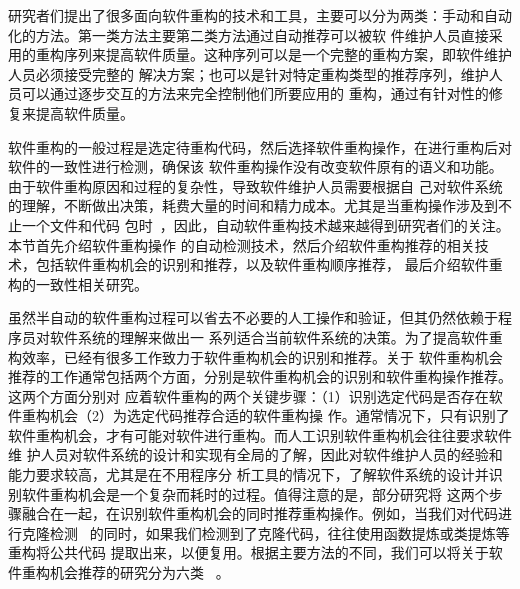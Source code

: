 研究者们提出了很多面向软件重构的技术和工具，主要可以分为两类：手动和自动化的方法。第一类方法主要第二类方法通过自动推荐可以被软
件维护人员直接采用的重构序列来提高软件质量\cite{harman2007pareto, kessentini2011design,
ouni2013maintainability, Silva2014}。这种序列可以是一个完整的重构方案，即软件维护人员必须接受完整的
解决方案；也可以是针对特定重构类型的推荐序列，维护人员可以通过逐步交互的方法来完全控制他们所要应用的
重构，通过有针对性的修复来提高软件质量。

软件重构的一般过程是选定待重构代码，然后选择软件重构操作，在进行重构后对软件的一致性进行检测，确保该
软件重构操作没有改变软件原有的语义和功能。由于软件重构原因和过程的复杂性，导致软件维护人员需要根据自
己对软件系统的理解，不断做出决策，耗费大量的时间和精力成本。尤其是当重构操作涉及到不止一个文件和代码
包时~\cite{liu2013monitor}，因此，自动软件重构技术越来越得到研究者们的关注。本节首先介绍软件重构操作
的自动检测技术，然后介绍软件重构推荐的相关技术，包括软件重构机会的识别和推荐，以及软件重构顺序推荐，
最后介绍软件重构的一致性相关研究。


虽然半自动的软件重构过程可以省去不必要的人工操作和验证，但其仍然依赖于程序员对软件系统的理解来做出一
系列适合当前软件系统的决策。为了提高软件重构效率，已经有很多工作致力于软件重构机会的识别和推荐。关于
软件重构机会推荐的工作通常包括两个方面，分别是软件重构机会的识别和软件重构操作推荐。这两个方面分别对
应着软件重构的两个关键步骤：（1）识别选定代码是否存在软件重构机会（2）为选定代码推荐合适的软件重构操
作。通常情况下，只有识别了软件重构机会，才有可能对软件进行重构。而人工识别软件重构机会往往要求软件维
护人员对软件系统的设计和实现有全局的了解，因此对软件维护人员的经验和能力要求较高，尤其是在不用程序分
析工具的情况下，了解软件系统的设计并识别软件重构机会是一个复杂而耗时的过程。值得注意的是，部分研究将
这两个步骤融合在一起，在识别软件重构机会的同时推荐重构操作。例如，当我们对代码进行克隆检测
~\cite{kamiya2002ccfinder}的同时，如果我们检测到了克隆代码，往往使用函数提炼或类提炼等重构将公共代码
提取出来，以便复用。根据主要方法的不同，我们可以将关于软件重构机会推荐的研究分为六类
~\cite{al2015identifying}。

 
\iffalse
\subsubsection{基于软件质量度量的重构机会推荐}
\subsubsection{基于前置条件的重构机会推荐}
\subsubsection{基于聚类的重构机会推荐}
\subsubsection{基于图的重构机会推荐}
\subsubsection{基于代码切片的重构机会推荐}
\subsubsection{基于动态分析的重构机会推荐}
\subsection{软件重构顺序推荐}
\fi
